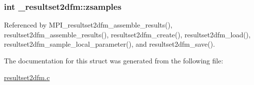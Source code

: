 \subsubsection[{\texorpdfstring{zsamples}{zsamples}}]{\setlength{\rightskip}{0pt plus 5cm}int \+\_\+resultset2dfm\+::zsamples}\hypertarget{struct__resultset2dfm_a1530a46f54a76c820b6a1a8180972c50}{}\label{struct__resultset2dfm_a1530a46f54a76c820b6a1a8180972c50}


Referenced by M\+P\+I\+\_\+resultset2dfm\+\_\+assemble\+\_\+results(), resultset2dfm\+\_\+assemble\+\_\+results(), resultset2dfm\+\_\+create(), resultset2dfm\+\_\+load(), resultset2dfm\+\_\+sample\+\_\+local\+\_\+parameter(), and resultset2dfm\+\_\+save().



The documentation for this struct was generated from the following file\+:\begin{DoxyCompactItemize}
\item 
\hyperlink{resultset2dfm_8c}{resultset2dfm.\+c}\end{DoxyCompactItemize}
